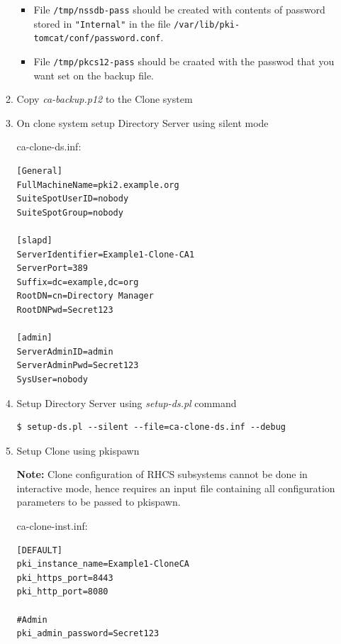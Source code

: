 \documentclass[a4paper]{article}
\begin{document}
\begin{enumerate}[label*=\arabic*.]
\begin{enumerate}[label*=\arabic*.]
\begin{itemize}
                            \item File \texttt{/tmp/nssdb-pass} should be created with contents of password stored in
                        \texttt{"Internal"} in the file \texttt{/var/lib/pki-tomcat/conf/password.conf}. 
                            \item File \texttt{/tmp/pkcs12-pass} should be craated with the passwod that you want set on
                                the backup file. 
                        \end{itemize}
                    \item Copy \textit{ca-backup.p12} to the Clone system
                    \item On clone system setup Directory Server using silent mode

ca-clone-ds.inf:                         
                        \begin{lstlisting}[style=configFile]
[General]
FullMachineName=pki2.example.org
SuiteSpotUserID=nobody
SuiteSpotGroup=nobody

[slapd]
ServerIdentifier=Example1-Clone-CA1
ServerPort=389
Suffix=dc=example,dc=org
RootDN=cn=Directory Manager
RootDNPwd=Secret123

[admin]
ServerAdminID=admin
ServerAdminPwd=Secret123
SysUser=nobody                       
                        \end{lstlisting}
                    \item Setup Directory Server using \textit{setup-ds.pl} command
                        \begin{lstlisting}[style=bashInputStyle]
$ setup-ds.pl --silent --file=ca-clone-ds.inf --debug                    
                        \end{lstlisting}

                    \item Setup Clone using pkispawn
                    
                    \textbf{Note:} Clone configuration of RHCS subsystems cannot be done in interactive mode, hence requires
                    an input file containing all configuration parameters to be passed to pkispawn.

ca-clone-inst.inf:                    
                    \begin{lstlisting}[style=configFile]
[DEFAULT]
pki_instance_name=Example1-CloneCA
pki_https_port=8443
pki_http_port=8080

#Admin
pki_admin_password=Secret123


\end{lstlisting}
\end{enumerate}
\end{enumerate}
\end{document}
